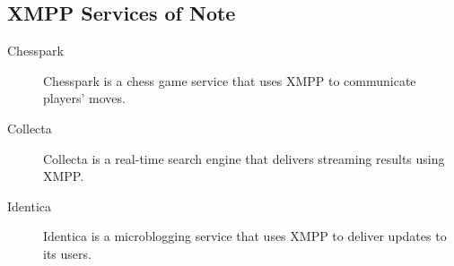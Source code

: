 \subsection*{XMPP Services of Note}

\begin{description}
\item[Chesspark] Chesspark is a chess game service that uses XMPP to communicate players' moves.
\item[Collecta]  Collecta is a real-time search engine that delivers streaming results using XMPP.
\item[Identica]  Identica is a microblogging service that uses XMPP to deliver updates to its users.
\end{description}
